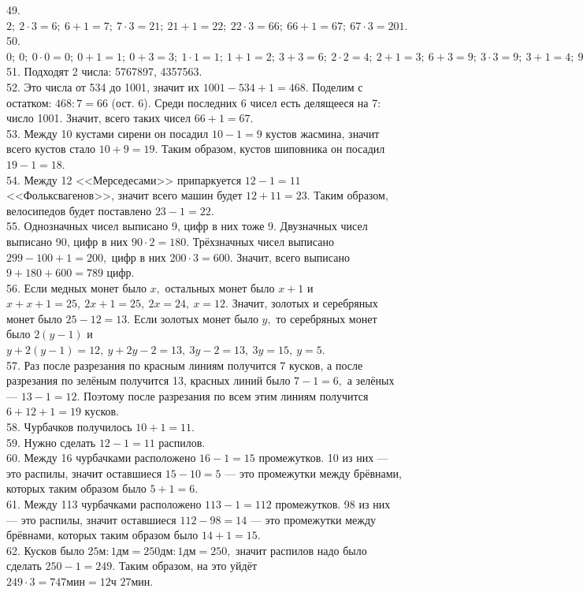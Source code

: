 \documentclass[12pt]{article}
\begin{document}
49. $2;\ 2\cdot3=6;\ 6+1=7;\ 7\cdot3=21;\ 21+1=22;\ 22\cdot3=66;\ 66+1=67;\ 67\cdot3=201.$\\
50. $0;\ 0;\ 0\cdot0=0;\ 0+1=1;\ 0+3=3;\ 1\cdot1=1;\ 1+1=2;\ 3+3=6;\ 2\cdot2=4;\ 2+1=3;\ 6+3=9;\ 3\cdot3=9;\ 3+1=4;\ 9+3=12;\ 4\cdot4=16;\ 4+1=5;\ 12+3=15;\ 5\cdot5=25.$\\
51. Подходят 2 числа: 5767897, 4357563.\\
52. Это числа от 534 до 1001, значит их $1001-534+1=468.$ Поделим с остатком: $468:7=66$ (ост. 6). Среди последних 6 чисел есть делящееся на 7: число 1001. Значит, всего таких чисел $66+1=67.$\\
53. Между 10 кустами сирени он посадил $10-1=9$ кустов жасмина, значит всего кустов стало $10+9=19.$ Таким образом, кустов шиповника он посадил $19-1=18.$\\
54. Между 12 <<Мерседесами>> припаркуется $12-1=11$ <<Фольксвагенов>>, значит всего машин будет $12+11=23.$ Таким образом, велосипедов будет поставлено $23-1=22.$\\
55. Однозначных чисел выписано 9, цифр в них тоже 9. Двузначных чисел выписано 90, цифр в них $90\cdot2=180.$ Трёхзначных чисел выписано $299-100+1=200,$ цифр в них $200\cdot3=600.$ Значит, всего выписано $9+180+600=789$ цифр.\\
56. Если медных монет было $x,$ остальных монет было $x+1$ и $x+x+1=25,\ 2x+1=25,\ 2x=24,\ x=12.$ Значит, золотых и серебряных монет было $25-12=13.$ Если золотых монет было $y,$ то серебряных монет было $2(y-1)$ и $y+2(y-1)=12,\ y+2y-2=13,\ 3y-2=13,\ 3y=15,\ y=5.$\\
57. Раз после разрезания по красным линиям получится 7 кусков, а после разрезания по зелёным получится 13, красных линий было $7-1=6,$ а зелёных --- $13-1=12.$ Поэтому после разрезания по всем этим линиям получится $6+12+1=19$ кусков.\\
58. Чурбачков получилось $10+1=11.$\\
59. Нужно сделать $12-1=11$ распилов.\\
60. Между 16 чурбачками расположено $16-1=15$ промежутков. 10 из них --- это распилы, значит оставшиеся $15-10=5$ --- это промежутки между брёвнами, которых таким образом было $5+1=6.$\\
61. Между 113 чурбачками расположено $113-1=112$ промежутков. 98 из них --- это распилы, значит оставшиеся $112-98=14$ --- это промежутки между брёвнами, которых таким образом было $14+1=15.$\\
62. Кусков было $25\text{м}:1\text{дм}=250\text{дм}:1\text{дм}=250,$ значит распилов надо было сделать $250-1=249.$ Таким образом, на это уйдёт $249\cdot3=747\text{мин}=12\text{ч }27\text{мин}.$\\
\end{document}
